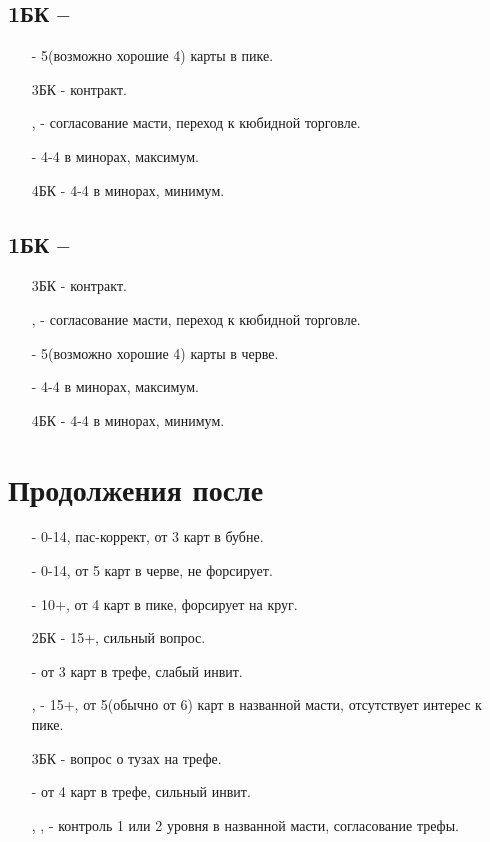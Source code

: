 \documentclass{article}
\begin{document}
\subsection{1БК -- }
\begin{enumerate}
    \item[\sp{3}] - 5(возможно хорошие 4) карты в пике. 
    \item[3БК] - контракт.
    \item[\cl{4}, \di{4}] - согласование масти, переход к кюбидной торговле.
    \item[\he{4}] - 4-4 в минорах, максимум.
    \item[4БК] - 4-4 в минорах, минимум.
\end{enumerate}
\subsection{1БК -- }
\begin{enumerate}
    \item[3БК] - контракт.
    \item[\cl{4}, \di{4}] - согласование масти, переход к кюбидной торговле.
    \item[\he{4}] - 5(возможно хорошие 4) карты в черве. 
    \item[\sp{4}] - 4-4 в минорах, максимум.
    \item[4БК] - 4-4 в минорах, минимум.
\end{enumerate}
\section{Продолжения после }
\begin{enumerate}
    \item[\di{2}] - 0-14, пас-коррект, от 3 карт в бубне.
    \item[\he{2}] - 0-14, от 5 карт в черве, не форсирует.
    \item[\sp{2}] - 10+, от 4 карт в пике, форсирует на круг.
    \item[2БК] - 15+, сильный вопрос.
    \item[\cl{3}] - от 3 карт в трефе, слабый инвит.
    \item[\di{3}, \he{3}] - 15+, от 5(обычно от 6) карт в названной масти, отсутствует интерес к пике. 
    \item[3БК] - вопрос о тузах на трефе.
    \item[\cl{4}] - от 4 карт в трефе, сильный инвит.
    \item[\sp{3}, \di{4}, \he{4}] - контроль 1 или 2 уровня в названной масти, согласование трефы.
\end{enumerate}
\end{document}
